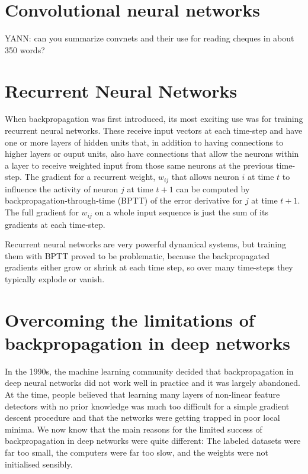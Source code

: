 \documentclass[]{article}
\begin{document}
\section{Convolutional neural networks}


YANN: can you summarize convnets and their use for reading cheques in about 350 words?


\section{Recurrent Neural Networks}

When backpropagation was first introduced, its most exciting use was for training recurrent neural networks. These
receive input vectors at each time-step and have one or more layers of hidden units that, in addition to having
connections to higher layers or ouput units, also have connections that allow the neurons within a layer to receive
weighted input from those same neurons at the previous time-step.  The gradient for a recurrent weight, $w_{ij}$ that
allows neuron $i$ at time $t$ to influence the activity of neuron $j$ at time $t+1$ can be computed by
backpropagation-through-time (BPTT) of the error derivative for $j$ at time $t+1$. The full gradient for $w_{ij}$ on a whole
input sequence is just the sum of its gradients at each time-step.

Recurrent neural networks are very powerful dynamical systems, but training them with BPTT proved to be problematic,
because the backpropagated gradients either grow or shrink at each time step, so over many time-steps they typically explode
or vanish\cite{Bengio, schmdhuber}.  

\section{Overcoming the limitations of backpropagation in deep networks}

In the 1990s, the machine learning community decided that backpropagation in deep neural networks did not work well in
practice and it was largely abandoned.  At the time, people believed that learning many layers of non-linear feature
detectors with no prior knowledge was much too difficult for a simple gradient descent procedure and that the networks
were getting trapped in poor local minima. We now know that the main reasons for the limited success of backpropagation
in deep networks were quite different: The labeled datasets were far too small, the computers were far too slow, and the
weights were not initialised sensibly. 
\end{document}
